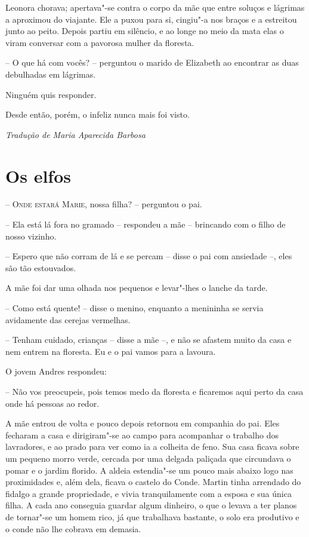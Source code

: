 Leonora chorava; apertava"-se contra o corpo da mãe que entre soluços e
lágrimas a aproximou do viajante. Ele a puxou para si, cingiu"-a nos
braços e a estreitou junto ao peito. Depois partiu em silêncio, e ao
longe no meio da mata elas o viram conversar com a pavorosa mulher da
floresta.

-- O que há com vocês? -- perguntou o marido de Elizabeth ao encontrar
as duas debulhadas em lágrimas.

Ninguém quis responder.

Desde então, porém, o infeliz nunca mais foi visto.
\medskip

\hfill\textit{Tradução de Maria Aparecida Barbosa}

\chapter{Os elfos}


\textsc{-- Onde estará Marie,} nossa filha? -- perguntou o pai.

-- Ela está lá fora no gramado -- respondeu a mãe -- 
brincando com o filho de nosso vizinho.

-- Espero que não corram de lá e se percam -- disse o pai com
ansiedade --, eles são tão estouvados.

A mãe foi dar uma olhada nos pequenos e levar"-lhes o lanche da tarde.

-- Como está quente! -- disse o menino, enquanto a menininha
se servia avidamente das cerejas vermelhas.

-- Tenham cuidado, crianças -- disse a mãe --, e não se
afastem muito da casa e nem entrem na floresta. 
Eu e o pai vamos para a lavoura.

O jovem Andres respondeu:

-- Não vos preocupeis, pois temos medo da floresta e ficaremos aqui
perto da casa onde há pessoas ao redor.

A mãe entrou de volta e pouco depois retornou em companhia do pai. Eles
fecharam a casa e dirigiram"-se ao campo para acompanhar o trabalho dos
lavradores, e ao prado para ver como ia a colheita de feno. Sua casa
ficava sobre um pequeno morro verde, cercada por uma delgada paliçada
que circundava o pomar e o jardim florido. A aldeia estendia"-se um
pouco mais abaixo logo nas proximidades e, além dela, ficava o castelo
do Conde. Martin tinha arrendado do fidalgo a grande propriedade, e
vivia tranquilamente com a esposa e sua única filha. A cada ano
conseguia guardar algum dinheiro, o que o levava a ter planos de
tornar"-se um homem rico, já que trabalhava bastante, o solo era
produtivo e o conde não lhe cobrava em demasia.

